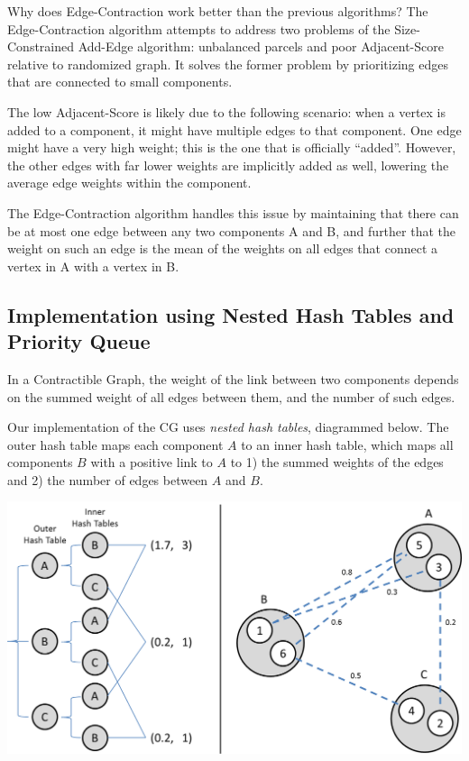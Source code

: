 Why does Edge-Contraction work better than the previous algorithms?
The Edge-Contraction algorithm attempts to address two problems of
the Size-Constrained Add-Edge algorithm: unbalanced parcels and poor
Adjacent-Score relative to randomized graph. It solves the former
problem by prioritizing edges that are connected to small components.

The low Adjacent-Score is likely due to the following scenario:
when a vertex is added to a component, it might have multiple
edges to that component. One edge might have a very high weight; this is
the one that is officially ``added''. However, the other edges with far
lower weights are implicitly added as well, lowering the average edge
weights within the component.

The Edge-Contraction algorithm handles this issue by maintaining that
there can be at most one edge between any two components A and B, and
further that the weight on such an edge is the mean of the weights on
all edges that connect a vertex in A with a vertex in B.

\subsection{Implementation using Nested Hash Tables and Priority Queue}

In a Contractible Graph, the weight of the link between two components
depends on the summed weight of all edges between them, and the number
of such edges.

Our implementation of the CG uses \textit{nested hash tables},
diagrammed below. The outer hash table maps each component $A$ to an
inner hash table, which maps all components $B$ with a positive link to
$A$ to 1) the summed weights of the edges and 2) the number of edges
between $A$ and $B$.

\includegraphics[scale = 0.6]{figs/4_cg_implement}

